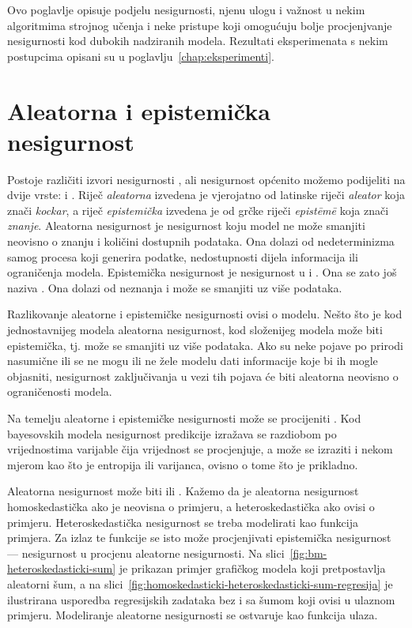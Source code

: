 \documentclass[utf8, diplomski, lmodern]{fer}
\begin{document}
Ovo poglavlje opisuje podjelu nesigurnosti, njenu ulogu i važnost u nekim algoritmima strojnog učenja i neke pristupe koji omogućuju bolje procjenjvanje nesigurnosti kod dubokih nadziranih modela. Rezultati eksperimenata s nekim postupcima opisani su u poglavlju~\ref{chap:eksperimenti}.


\section{Aleatorna i epistemička nesigurnost}

Postoje različiti izvori nesigurnosti \citep{Kennedy:2002:BCCM}, ali nesigurnost općenito možemo podijeliti na dvije vrste:  i  \citep{Kiureghian:2009:AEDM}. Riječ \textit{aleatorna} izvedena je vjerojatno od latinske riječi \textit{aleator} \citep{Gal:2016:UDL} koja znači \textit{kockar}, a riječ \textit{epistemička} izvedena je od grčke riječi \textit{epist\={e}m\={e}} koja znači \textit{znanje}. Aleatorna nesigurnost je nesigurnost koju model ne može smanjiti neovisno o znanju i količini dostupnih podataka. Ona dolazi od nedeterminizma samog procesa koji generira podatke, nedostupnosti dijela informacija ili ograničenja modela. Epistemička nesigurnost je nesigurnost u  i  \citep{Gal:2016:UDL}. Ona se zato još naziva . Ona dolazi od neznanja i može se smanjiti uz više podataka.

Razlikovanje aleatorne i epistemičke nesigurnosti ovisi o modelu. Nešto što je kod jednostavnijeg modela aleatorna nesigurnost, kod složenijeg modela može biti epistemička, tj. može se smanjiti uz više podataka. Ako su neke pojave po prirodi nasumične ili se ne mogu ili ne žele modelu dati informacije koje bi ih mogle objasniti, nesigurnost zaključivanja u vezi tih pojava će biti aleatorna neovisno o ograničenosti modela.

Na temelju aleatorne i epistemičke nesigurnosti može se procijeniti . Kod bayesovskih modela nesigurnost predikcije izražava se razdiobom po vrijednostima varijable čija vrijednost se procjenjuje, a može se izraziti i nekom mjerom kao što je entropija ili varijanca, ovisno o tome što je prikladno.

Aleatorna nesigurnost može biti  ili . Kažemo da je aleatorna nesigurnost homoskedastička ako je neovisna o primjeru, a heteroskedastička ako ovisi o primjeru. Heteroskedastička nesigurnost se treba modelirati kao funkcija primjera. Za izlaz te funkcije se isto može procjenjivati epistemička nesigurnost --- nesigurnost u procjenu aleatorne nesigurnosti. Na slici~\ref{fig:bm-heteroskedasticki-sum} je prikazan primjer grafičkog modela koji pretpostavlja aleatorni šum, a na slici~\ref{fig:homoskedasticki-heteroskedasticki-sum-regresija} je ilustrirana usporedba regresijskih zadataka bez i sa šumom koji ovisi u ulaznom primjeru. Modeliranje aleatorne nesigurnosti se ostvaruje kao funkcija ulaza.
\end{document}
